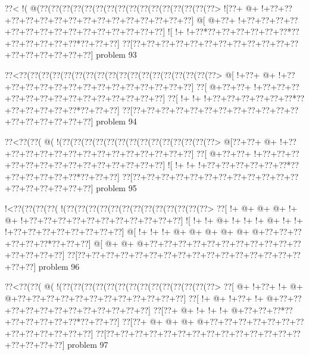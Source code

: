 \vbox{\vbox{\goo
\0??<\- !(\- @(\0??(\0??(\0??(\0??(\0??(\0??(\0??(\0??(\0??(\0??(\0??(\0??(\0??(\0??(\0??(\0??>
\- ![\0??+\- @+\- !+\0??+\0??+\0??+\0??+\0??+\0??+\0??+\0??+\0??+\0??+\0??+\0??+\0??+\0??+\0??]
\- @[\- @+\0??+\- !+\0??+\0??+\0??+\0??+\0??+\0??+\0??+\0??+\0??+\0??+\0??+\0??+\0??+\0??+\0??]
\- ![\- !+\- !+\0??*\0??+\0??+\0??+\0??+\0??+\0??*\0??+\0??+\0??+\0??+\0??+\0??*\0??+\0??+\0??]
\0??[\0??+\0??+\0??+\0??+\0??+\0??+\0??+\0??+\0??+\0??+\0??+\0??+\0??+\0??+\0??+\0??+\0??+\0??]
}
\hfil problem 93\hfil\break
}



\vbox{\vbox{\goo
\0??<\0??(\0??(\0??(\0??(\0??(\0??(\0??(\0??(\0??(\0??(\0??(\0??(\0??(\0??(\0??(\0??(\0??(\0??>
\- @[\- !+\0??+\- @+\- !+\0??+\0??+\0??+\0??+\0??+\0??+\0??+\0??+\0??+\0??+\0??+\0??+\0??+\0??]
\0??[\- @+\0??+\0??+\- !+\0??+\0??+\0??+\0??+\0??+\0??+\0??+\0??+\0??+\0??+\0??+\0??+\0??+\0??]
\0??[\- !+\- !+\- !+\0??+\0??+\0??+\0??+\0??+\0??*\0??+\0??+\0??+\0??+\0??+\0??*\0??+\0??+\0??]
\0??[\0??+\0??+\0??+\0??+\0??+\0??+\0??+\0??+\0??+\0??+\0??+\0??+\0??+\0??+\0??+\0??+\0??+\0??]
}
\hfil problem 94\hfil\break
}



\vbox{\vbox{\goo
\0??<\0??(\0??(\- @(\- !(\0??(\0??(\0??(\0??(\0??(\0??(\0??(\0??(\0??(\0??(\0??(\0??(\0??(\0??>
\- @[\0??+\0??+\- @+\- !+\0??+\0??+\0??+\0??+\0??+\0??+\0??+\0??+\0??+\0??+\0??+\0??+\0??+\0??]
\0??[\- @+\0??+\0??+\- !+\0??+\0??+\0??+\0??+\0??+\0??+\0??+\0??+\0??+\0??+\0??+\0??+\0??+\0??]
\- ![\- !+\- !+\- !+\0??+\0??+\0??+\0??+\0??+\0??*\0??+\0??+\0??+\0??+\0??+\0??*\0??+\0??+\0??]
\0??[\0??+\0??+\0??+\0??+\0??+\0??+\0??+\0??+\0??+\0??+\0??+\0??+\0??+\0??+\0??+\0??+\0??+\0??]
}
\hfil problem 95\hfil\break
}



\vbox{\vbox{\goo
\- !<\0??(\0??(\0??(\0??(\- !(\0??(\0??(\0??(\0??(\0??(\0??(\0??(\0??(\0??(\0??(\0??(\0??(\0??>
\0??[\- !+\- @+\- @+\- @+\- !+\- @+\- !+\0??+\0??+\0??+\0??+\0??+\0??+\0??+\0??+\0??+\0??+\0??]
\- ![\- !+\- !+\- @+\- !+\- !+\- !+\- @+\- !+\- !+\- !+\0??+\0??+\0??+\0??+\0??+\0??+\0??+\0??]
\- @[\- !+\- !+\- !+\- @+\- @+\- @+\- @+\- @+\- @+\0??+\0??+\0??+\0??+\0??+\0??*\0??+\0??+\0??]
\- @[\- @+\- @+\- @+\0??+\0??+\0??+\0??+\0??+\0??+\0??+\0??+\0??+\0??+\0??+\0??+\0??+\0??+\0??]
\0??[\0??+\0??+\0??+\0??+\0??+\0??+\0??+\0??+\0??+\0??+\0??+\0??+\0??+\0??+\0??+\0??+\0??+\0??]
}
\hfil problem 96\hfil\break
}



\vbox{\vbox{\goo
\0??<\0??(\0??(\- @(\- !(\0??(\0??(\0??(\0??(\0??(\0??(\0??(\0??(\0??(\0??(\0??(\0??(\0??(\0??>
\0??[\- @+\- !+\0??+\- !+\- @+\- @+\0??+\0??+\0??+\0??+\0??+\0??+\0??+\0??+\0??+\0??+\0??+\0??]
\0??[\- !+\- @+\- !+\0??+\- !+\- @+\0??+\0??+\0??+\0??+\0??+\0??+\0??+\0??+\0??+\0??+\0??+\0??]
\0??[\0??+\- @+\- !+\- !+\- !+\- @+\0??+\0??+\0??*\0??+\0??+\0??+\0??+\0??+\0??*\0??+\0??+\0??]
\0??[\0??+\- @+\- @+\- @+\- @+\0??+\0??+\0??+\0??+\0??+\0??+\0??+\0??+\0??+\0??+\0??+\0??+\0??]
\0??[\0??+\0??+\0??+\0??+\0??+\0??+\0??+\0??+\0??+\0??+\0??+\0??+\0??+\0??+\0??+\0??+\0??+\0??]
}
\hfil problem 97\hfil\break
}



